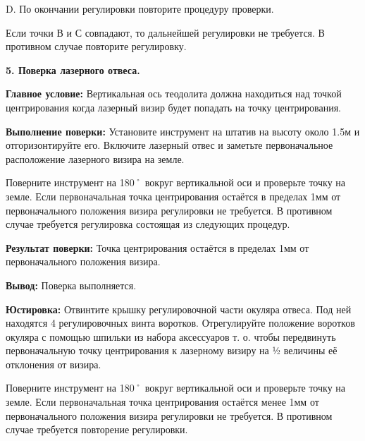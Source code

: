 \documentclass[a4paper]{article}
\begin{document}
{D. По окончании регулировки повторите процедуру проверки. 
\par Если точки В и С совпадают, то дальнейшей регулировки не требуется. В противном случае повторите
регулировку.
\par\textbf{5. Поверка лазерного отвеса.}
\par \textbf{Главное условие:} Вертикальная ось теодолита должна находиться над
точкой центрирования когда лазерный визир будет попадать на точку центрирования.
\par \textbf{Выполнение поверки:} Установите инструмент на штатив на высоту около 1.5м и отгоризонтируйте его. Включите лазерный отвес и заметьте первоначальное расположение лазерного визира на
земле.
\par Поверните инструмент на 180˚ вокруг вертикальной оси и проверьте точку на
земле. Если первоначальная точка центрирования остаётся в пределах 1мм от
первоначального положения визира регулировки не требуется. В противном случае
требуется регулировка состоящая из следующих процедур.
\par \textbf{Результат поверки:} Точка центрирования остаётся в пределах 1мм от
первоначального положения визира.
\par\textbf{Вывод:} Поверка выполняется.
\par \textbf{Юстировка:} Отвинтите крышку регулировочной части окуляра отвеса. Под ней находятся 4
регулировочных винта воротков. Отрегулируйте положение воротков окуляра с
помощью шпильки из набора аксессуаров т. о. чтобы передвинуть
первоначальную точку центрирования к лазерному визиру на ½ величины её
отклонения от визира.
\par Поверните инструмент на 180˚ вокруг вертикальной оси и проверьте точку на
земле. Если первоначальная точка центрирования остаётся менее 1мм от первоначального
положения визира регулировки не требуется. В противном случае требуется повторение
регулировки.
}
\end{document}
